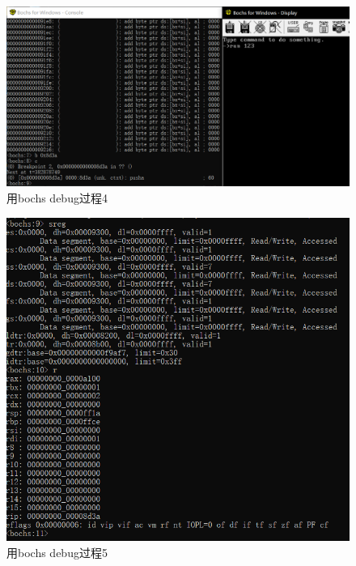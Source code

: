 \documentclass[a4paper, 11pt]{article} %
\begin{document}
\begin{figure}[H]
  \centering
  \includegraphics[width=0.8\linewidth]{bochsdbg4.png}
  \caption{用bochs debug过程4}
  \label{fig:bochsdbg4}
\end{figure}
\begin{figure}[H]
  \centering
  \includegraphics[width=0.8\linewidth]{bochsdbg5.png}
  \caption{用bochs debug过程5}
  \label{fig:bochsdbg5}
\end{figure}
\end{document}
